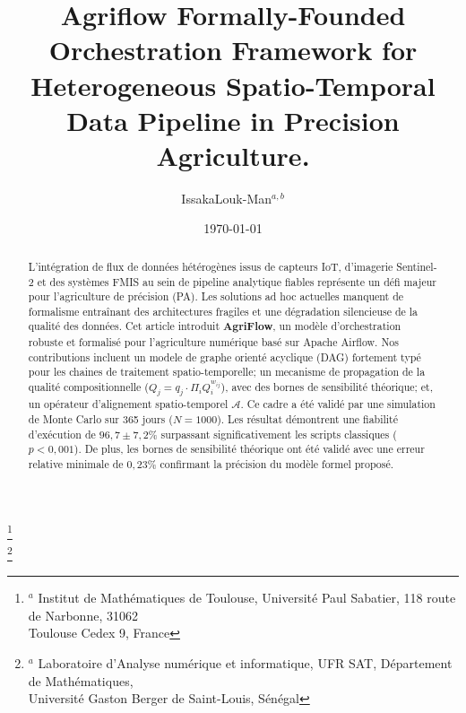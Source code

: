 \documentclass[12pt]{article}
\title{\rm Agriflow Formally-Founded Orchestration Framework for Heterogeneous Spatio-Temporal Data Pipeline in Precision Agriculture.}
\author{IssakaLouk-Man$^{a,b}$ }
\date{\today}
\begin{document}
\newcommand{\Bc}{\mathscr{B}}
\newcommand{\Vilbert}{\mathcal{V}}
\newcommand{\Xilbert}{\mathbf{X}}
\newcommand{\Kilbert}{\mathbf{K}}

\fontsize{12pt}{23pt}\selectfont

\maketitle
{\footnotesize
	\begin{flushleft}
		\hspace{1cm}\thanks{$^a$ Institut de Mathématiques de Toulouse, Université Paul Sabatier, 118 route de Narbonne, 31062 \\
			\hspace{1.5cm}Toulouse Cedex 9, France}\\
		\hspace{1cm}\thanks{$^a$ Laboratoire d'Analyse num\'{e}rique et informatique, UFR SAT, D\'{e}partement de Math\'{e}matiques,\\
			\hspace{1.5cm} Universit\'{e} Gaston Berger de Saint-Louis, S\'{e}n\'{e}gal}\\
\end{flushleft}}
\begin{abstract}
	L'intégration de flux de données hétérogènes issus de capteurs IoT, d'imagerie Sentinel-2 et des systèmes FMIS au sein de pipeline analytique fiables représente un défi majeur pour l'agriculture de précision (PA). Les solutions ad hoc actuelles manquent de formalisme entraînant des architectures fragiles et une dégradation silencieuse de la qualité des données.   Cet article introduit \textbf{AgriFlow}, un modèle  d'orchestration robuste et formalisé pour l'agriculture numérique basé sur Apache Airflow.  Nos contributions incluent un modele de graphe orienté acyclique (DAG) fortement typé pour les chaines de traitement spatio-temporelle;  un mecanisme de propagation de la qualité compositionnelle ($Q_j=q_j\cdot \Pi_{i} Q_i^{w_{ij}}$), avec des bornes de sensibilité théorique; et, un opérateur d'alignement spatio-temporel $\mathcal{A}$. Ce cadre a été validé par une simulation de Monte Carlo sur 365 jours ($N=1000$).  Les résultat démontrent une fiabilité d’exécution de $96,7\pm7,2\%$ surpassant significativement les scripts classiques ($p< 0,001$). De plus, les bornes de sensibilité théorique ont été validé avec une erreur relative minimale de $0,23\%$ confirmant la précision du modèle formel proposé.
\end{abstract}
\end{document}
